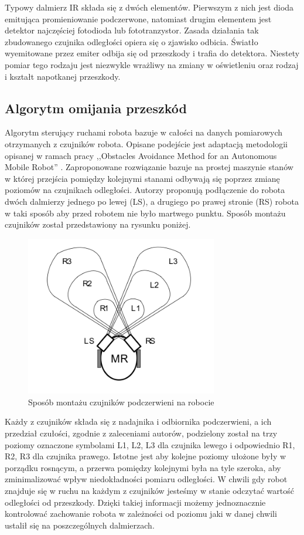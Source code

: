 Typowy dalmierz IR składa się z dwóch elementów. Pierwszym z nich jest dioda
emitująca promieniowanie podczerwone, natomiast drugim elementem jest detektor
najczęściej fotodioda lub fototranzystor. 
Zasada działania tak zbudowanego
czujnika odległości opiera się o zjawisko odbicia. Światło wyemitowane przez
emiter odbija się od przeszkody i trafia do detektora. Niestety pomiar tego
rodzaju jest niezwykle wrażliwy na zmiany w oświetleniu oraz rodzaj i kształt
napotkanej przeszkody.
 
\subsection{Algorytm omijania przeszkód}
Algorytm sterujący ruchami robota bazuje w całości na danych pomiarowych
otrzymanych z czujników robota. Opisane podejście jest adaptacją metodologii
opisanej w ramach pracy ,,Obstacles Avoidance Method for an Autonomous Mobile
Robot'' \cite{ObstaclesAvoidanceIR}. Zaproponowane rozwiązanie bazuje na prostej
maszynie stanów w której przejścia pomiędzy kolejnymi stanami odbywają się
poprzez zmianę poziomów na czujnikach odległości. Autorzy proponują podłączenie
do robota dwóch dalmierzy jednego po lewej (LS), a drugiego po prawej stronie
(RS) robota w taki sposób aby przed robotem nie było martwego punktu. Sposób
montażu czujników został przedstawiony na rysunku poniżej.

\begin{figure}[h!]
 \centering
 \includegraphics[height=70mm]{../images/ch04/ir_sensor_position.png}
 \caption{Sposób montażu czujników podczerwieni na robocie \cite{ObstaclesAvoidanceIR}}
 \label{fig:IRSensorPosition}
\end{figure}

Każdy z czujników składa się z nadajnika i odbiornika podczerwieni, a ich
przedział czułości, zgodnie z zaleceniami autorów, podzielony został na trzy
poziomy oznaczone symbolami L1, L2, L3 dla czujnika lewego i odpowiednio R1, R2,
R3 dla czujnika prawego. Istotne jest aby kolejne poziomy ułożone były w porządku
rosnącym, a przerwa pomiędzy kolejnymi była na tyle szeroka, aby zminimalizować
wpływ niedokładności pomiaru odległości. W chwili gdy robot znajduje się w ruchu
na każdym z czujników jesteśmy w stanie odczytać wartość odległości od
przeszkody. Dzięki takiej informacji możemy jednoznacznie kontrolować zachowanie
robota w zależności od poziomu jaki w danej chwili ustalił się na poszczególnych
dalmierzach. 

